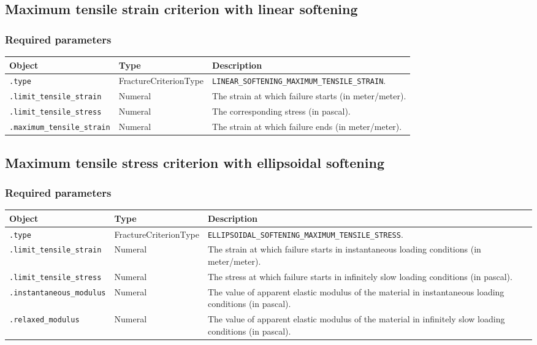 \documentclass[10pt]{article}
\begin{document}
\subsection{Maximum tensile strain criterion with linear softening}

\subsubsection*{Required parameters}

\begin{tabularx}{\textwidth}{llX}
\hline 
Object & Type & Description \\ 
\hline 
\verb+.type+ & FractureCriterionType & \verb+LINEAR_SOFTENING_MAXIMUM_TENSILE_STRAIN+. \\ 
\verb+.limit_tensile_strain+ & Numeral & The strain at which failure starts (in meter/meter).\\
\verb+.limit_tensile_stress+ & Numeral & The corresponding stress (in pascal).\\
\verb+.maximum_tensile_strain+ & Numeral & The strain at which failure ends (in meter/meter).\\
\hline 
\end{tabularx}

\subsection{Maximum tensile stress criterion with ellipsoidal softening}

\subsubsection*{Required parameters}

\begin{tabularx}{\textwidth}{llX}
\hline 
Object & Type & Description \\ 
\hline 
\verb+.type+ & FractureCriterionType & \verb+ELLIPSOIDAL_SOFTENING_MAXIMUM_TENSILE_STRESS+. \\ 
\verb+.limit_tensile_strain+ & Numeral & The strain at which failure starts in instantaneous loading conditions (in meter/meter).\\
\verb+.limit_tensile_stress+ & Numeral & The stress at which failure starts in infinitely slow loading conditions  (in pascal).\\
\verb+.instantaneous_modulus+ & Numeral & The value of apparent elastic modulus of the material in instantaneous loading conditions (in pascal).\\
\verb+.relaxed_modulus+ & Numeral & The value of apparent elastic modulus of the material in infinitely slow loading conditions (in pascal).\\
\hline 
\end{tabularx}
\end{document}
